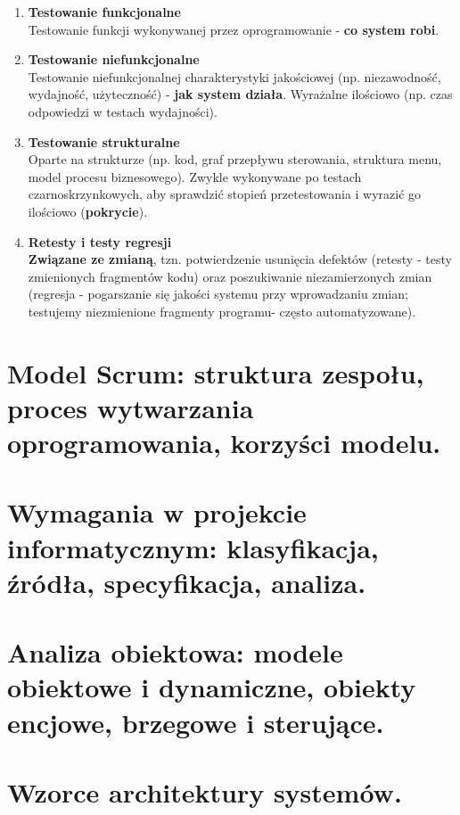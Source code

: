 \documentclass[12pt]{article}
\begin{document}
    \begin{enumerate}
        \item  \textbf{Testowanie funkcjonalne}\\
        Testowanie funkcji wykonywanej przez oprogramowanie - \textbf{co system robi}.

        \item \textbf{Testowanie niefunkcjonalne}\\
        Testowanie niefunkcjonalnej charakterystyki jakościowej (np. niezawodność, wydajność,
        użyteczność) - \textbf{jak system działa}. Wyrażalne ilościowo (np. czas odpowiedzi w testach wydajności).

        \item \textbf{Testowanie strukturalne}\\
        Oparte na strukturze (np. kod, graf przepływu sterowania, struktura menu, model procesu biznesowego).
        Zwykle wykonywane po testach czarnoskrzynkowych, aby sprawdzić stopień przetestowania i wyrazić go ilościowo
        (\textbf{pokrycie}).

        \item \textbf{Retesty i testy regresji}\\
        \textbf{Związane ze zmianą}, tzn. potwierdzenie usunięcia defektów (retesty - testy zmienionych fragmentów kodu)
        oraz poszukiwanie niezamierzonych zmian (regresja - pogarszanie się jakości systemu przy wprowadzaniu zmian;
        testujemy niezmienione fragmenty programu- często automatyzowane).
    \end{enumerate}

    \newpage

    \section{Model Scrum: struktura zespołu, proces wytwarzania oprogramowania, korzyści modelu.}
    \section{Wymagania w projekcie informatycznym: klasyfikacja, źródła, specyfikacja, analiza.}
    \section{Analiza obiektowa: modele obiektowe i dynamiczne, obiekty encjowe, brzegowe i sterujące.}
    \section{Wzorce architektury systemów.}
\end{document}
